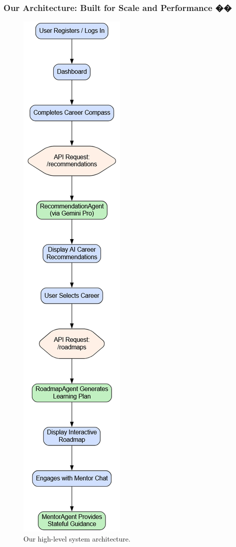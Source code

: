 \documentclass{beamer}
\begin{document}
\begin{frame}
  \frametitle{Our Architecture: Built for Scale and Performance ��️}
    \begin{figure}
    \includegraphics[height=0.8\textheight, keepaspectratio]{assets/architecture_diagram.png}
    \caption{Our high-level system architecture.}
  \end{figure}
\end{frame}
\end{document}

